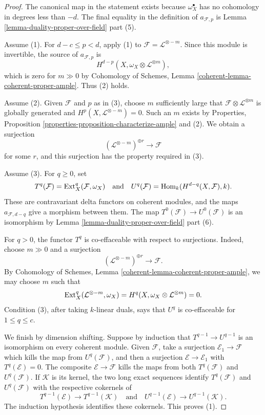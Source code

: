 \begin{proof}
The canonical map in the statement exists because
$\omega_X^\bullet$ has no cohomology in degrees less than $-d$.
The final equality in the definition of $a_{\mathcal{F},p}$ is
Lemma \ref{lemma-duality-proper-over-field} part (5).

\medskip\noindent
Assume (1). For $d - c \leq p < d$, apply (1) to
$\mathcal{F} = \mathcal{L}^{\otimes -m}$. Since this module is invertible,
the source of $a_{\mathcal{F},p}$ is
$$
H^{d - p}(X, \omega_X \otimes \mathcal{L}^{\otimes m}),
$$
which is zero for $m \gg 0$ by
Cohomology of Schemes, Lemma \ref{coherent-lemma-coherent-proper-ample}.
Thus (2) holds.

\medskip\noindent
Assume (2). Given $\mathcal{F}$ and $p$ as in (3), choose $m$ sufficiently
large that $\mathcal{F} \otimes \mathcal{L}^{\otimes m}$ is globally
generated and $H^p(X, \mathcal{L}^{\otimes -m}) = 0$. Such an $m$ exists by
Properties, Proposition \ref{properties-proposition-characterize-ample}
and (2). We obtain a surjection
$$
(\mathcal{L}^{\otimes -m})^{\oplus r} \longrightarrow \mathcal{F}
$$
for some $r$, and this surjection has the property required in (3).

\medskip\noindent
Assume (3). For $q \geq 0$, set
$$
T^q(\mathcal{F}) = \mathop{\mathrm{Ext}}\nolimits_X^q(\mathcal{F}, \omega_X)
\quad\text{and}\quad
U^q(\mathcal{F}) = \mathop{\mathrm{Hom}}\nolimits_k(H^{d - q}(X, \mathcal{F}), k).
$$
These are contravariant delta functors on coherent modules, and the maps
$a_{\mathcal{F},d-q}$ give a morphism between them. The map
$T^0(\mathcal{F}) \to U^0(\mathcal{F})$ is an isomorphism by
Lemma \ref{lemma-duality-proper-over-field} part (6).

For $q > 0$, the functor $T^q$ is co-effaceable with respect to
surjections. Indeed, choose $m \gg 0$ and a surjection
$$
(\mathcal{L}^{\otimes -m})^{\oplus r} \longrightarrow \mathcal{F}.
$$
By Cohomology of Schemes, Lemma
\ref{coherent-lemma-coherent-proper-ample}, we may choose $m$ such that
$$
\mathop{\mathrm{Ext}}\nolimits_X^q(\mathcal{L}^{\otimes -m}, \omega_X) =
H^q(X, \omega_X \otimes \mathcal{L}^{\otimes m}) = 0.
$$
Condition (3), after taking $k$-linear duals, says that $U^q$ is
co-effaceable for $1 \leq q \leq c$.

We finish by dimension shifting. Suppose by induction that
$T^{q - 1} \to U^{q - 1}$ is an isomorphism on every coherent module.
Given $\mathcal{F}$, take a surjection $\mathcal{E}_1 \to \mathcal{F}$
which kills the map from $U^q(\mathcal{F})$, and then a surjection
$\mathcal{E} \to \mathcal{E}_1$ with $T^q(\mathcal{E}) = 0$.
The composite $\mathcal{E} \to \mathcal{F}$ kills the maps from both
$T^q(\mathcal{F})$ and $U^q(\mathcal{F})$. If $\mathcal{K}$ is its kernel,
the two long exact sequences identify $T^q(\mathcal{F})$ and
$U^q(\mathcal{F})$ with the respective cokernels of
$$
T^{q - 1}(\mathcal{E}) \longrightarrow T^{q - 1}(\mathcal{K})
\quad\text{and}\quad
U^{q - 1}(\mathcal{E}) \longrightarrow U^{q - 1}(\mathcal{K}).
$$
The induction hypothesis identifies these cokernels. This proves (1).


\end{proof}
